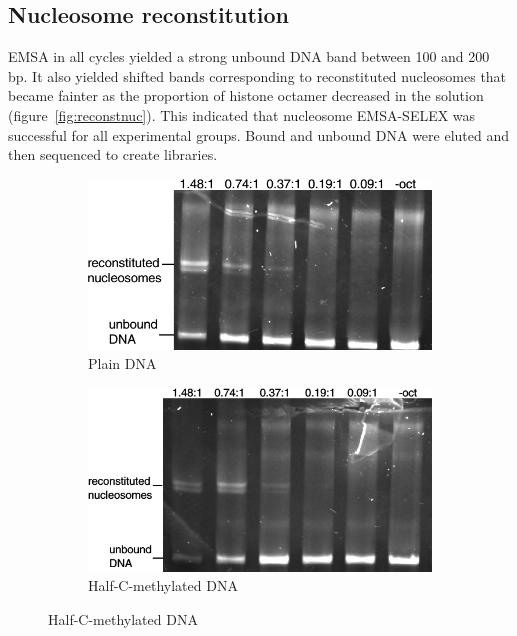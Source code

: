 \documentclass[a4paper, numbers=noenddot]{scrbook}
\begin{document}
\subsection{Nucleosome reconstitution}
\label{ssec:reconstnuc}

EMSA in all cycles yielded a strong unbound DNA band between 100 and 200 bp. It also yielded shifted bands corresponding to reconstituted nucleosomes that became fainter as the proportion of histone octamer decreased in the solution (figure~\ref{fig:reconstnuc}).  This indicated that nucleosome EMSA-SELEX was successful for all experimental groups.  Bound and unbound DNA were eluted and then sequenced to create libraries.

\begin{figure}[h]
  \centering
  \begin{subfigure}[htpb]{0.4\textwidth}
    \centering
    \includegraphics[width=\textwidth]{reconstnuc_a}
    \caption{Plain DNA}
    \label{fig:reconstnuc_a}
  \end{subfigure}
  \begin{subfigure}[htpb]{0.4\textwidth}
    \centering
    \includegraphics[width=\textwidth]{reconstnuc_b}
    \caption{Half-C-methylated DNA}
    \label{fig:reconstnuc_b}

\end{subfigure}
\end{figure}
\end{document}
